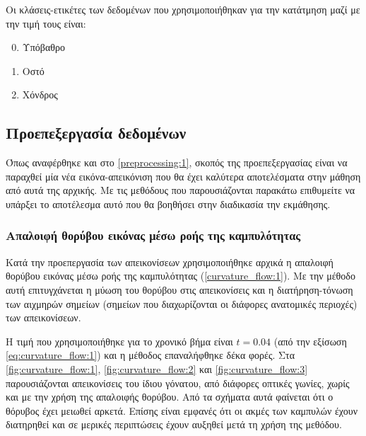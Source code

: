 \documentclass[a4paper,12pt]{article}
\begin{document}
Οι κλάσεις-ετικέτες των δεδομένων που χρησιμοποιήθηκαν για την κατάτμηση μαζί με
την τιμή τους είναι:

\begin{enumerate}
    \setcounter{enumi}{-1} 
    \item Υπόβαθρο
    \item Οστό
    \item Χόνδρος
\end{enumerate}

\subsection{Προεπεξεργασία δεδομένων}

Όπως αναφέρθηκε και στο \ref{preprocessing:1}, σκοπός της προεπεξεργασίας είναι
να παραχθεί μία νέα εικόνα-απεικόνιση που θα έχει καλύτερα αποτελέσματα στην
μάθηση από αυτά της αρχικής. Με τις μεθόδους που παρουσιάζονται παρακάτω
επιθυμείτε να υπάρξει το αποτέλεσμα αυτό που θα βοηθήσει στην διαδικασία την
εκμάθησης.

\subsubsection{Απαλοιφή θορύβου εικόνας μέσω ροής της καμπυλότητας}

Κατά την προεπεργασία των απεικονίσεων χρησιμοποιήθηκε αρχικά η απαλοιφή θορύβου
εικόνας μέσω ροής της καμπυλότητας (\ref{curvature_flow:1}). Με την μέθοδο αυτή
επιτυγχάνεται η μύωση του θορύβου στις απεικονίσεις και η διατήρηση-τόνωση των
αιχμηρών σημείων (σημείων που διαχωρίζονται οι διάφορες ανατομικές περιοχές) των
απεικονίσεων.

Η τιμή που χρησιμοποιήθηκε για το χρονικό βήμα είναι $t=0.04$ (από την εξίσωση
\eqref{eq:curvature_flow:1}) και η μέθοδος επαναλήφθηκε δέκα φορές.  Στα
\autoref{fig:curvature_flow:1}, \autoref{fig:curvature_flow:2} και
\autoref{fig:curvature_flow:3} παρουσιάζονται απεικονίσεις του ίδιου γόνατου,
από διάφορες οπτικές γωνίες, χωρίς και με την χρήση της απαλοιφής θορύβου. Από
τα σχήματα αυτά φαίνεται ότι ο θόρυβος έχει μειωθεί αρκετά. Επίσης είναι εμφανές
ότι οι ακμές των καμπυλών έχουν διατηρηθεί και σε μερικές περιπτώσεις έχουν
αυξηθεί μετά τη χρήση της μεθόδου.
\end{document}
